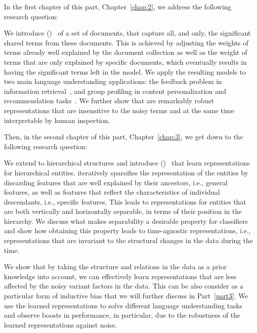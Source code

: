 In the first chapter of this part, Chapter~\ref{chap:2}, we address the following research question:

We introduce \emph{\swlms} (\acswlm)~\citep{Dehghani:2016:SIGIR} of a set of documents, that capture all, and only, the significant shared terms from these documents.  This is achieved by adjusting the weights of terms already well explained by the document collection as well as the weight of terms that are only explained by specific documents, which eventually results in having the significant terms left in the model. 
We apply the resulting models to two main language understanding applications: the feedback problem in information retrieval~\citep{Dehghani:CIKM2016:long, Dehghani:CIKM2016:short}, and group profiling in content personalization and recommendation tasks~\citep{Dehghani:2016:CHIIR,Dehghani2016:trec}. We further show that \acswlm are remarkably robust representations that are insensitive to the noisy terms and at the same time interpretable by human inspection. 

Then, in the second chapter of this part, Chapter~\ref{chap:3}, we get down to the following research question:

We extend \emph{\swlms} to hierarchical structures and introduce \emph{\hswlms} (\achswlm)~\citep{Dehghani:2016:ICTIR, Dehghani:2016:CLEF} that learn representations for hierarchical entities. \achswlm iteratively sparsifies the representation of the entities by discarding features that are well explained by their ancestors, i.e., general features, as well as features that reflect the characteristics of individual descendants, i.e., specific features. This leads to representations for entities that are both vertically and horizontally separable, in terms of their position in the hierarchy. We discuss what makes separability a desirable property for classifiers and show how obtaining this property leads to time-agnostic representations, i.e., representations that are invariant to the structural changes in the data during the time.

\medskip
We show that by taking the structure and relations in the data as a prior knowledge into account, we can effectively learn representations that are less affected by the noisy variant factors in the data. This can be also consider as a particular form of inductive bias that we will further discuss in Part~\ref{part3}. 
We use the learned representations to solve different language understanding tasks and observe boosts in performance, in particular, due to the robustness of the learned representations against noise.


